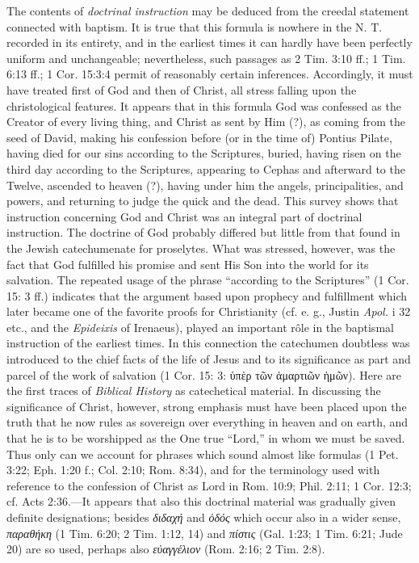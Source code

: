 The contents of \emph{doctrinal instruction} may be deduced from the creedal statement connected with baptism. It is true that this formula is nowhere in the N. T. recorded in its entirety, and in the earliest times it can hardly have been perfectly uniform and unchangeable; nevertheless, such passages as 2 Tim. 3:10 ff.; 1 Tim. 6:13 ff.; 1 Cor. 15:3:4 permit of reasonably certain inferences. Accordingly, it must have treated first of God and then of Christ, all stress falling upon the christological features. It appears that in this formula God was confessed as the Creator of every living thing, and Christ as sent by Him (?), as coming from the seed of David, making his confession before (or in the time of) Pontius Pilate, having died for our sins according to the Scriptures, buried, having risen on the third day according to the Scriptures, appearing to Cephas and afterward to the Twelve, ascended to heaven (?), having under him the angels, principalities, and powers, and returning to judge the quick and the dead. This survey shows that instruction concerning God and Christ was an integral part of doctrinal instruction. The doctrine of God probably differed but little from that found in the Jewish catechumenate for proselytes. What was stressed, however, was the fact that God fulfilled his promise and sent His Son into the world for its salvation. The repeated usage of the phrase “according to the Scriptures” (1 Cor. 15: 3 ff.) indicates that the argument based upon prophecy and fulfillment which later became one of the favorite proofs for Christianity (cf. e. g., Justin \emph{Apol.} i 32 etc., and the \emph{Epideixis} of Irenaeus), played an important rôle in the baptismal instruction of the earliest times. In this connection the catechumen doubtless was introduced to the chief facts of the life of Jesus and to its significance as part and parcel of the work of salvation (1 Cor. 15: 3: ὑπὲρ τῶν ἁμαρτιῶν ἡμῶν).
Here are the first traces of \emph{Biblical History} as catechetical material. In discussing the significance of Christ, however, strong emphasis must have been placed upon the truth that he now rules as sovereign over everything in heaven and on earth, and that he is to be worshipped as the One true “Lord,” in whom we must be saved. Thus only can we account for phrases which sound almost like formulas (1 Pet. 3:22; Eph. 1:20 f.; Col. 2:10; Rom. 8:34), and for the terminology used with reference to the confession of Christ as Lord in Rom. 10:9; Phil. 2:11; 1 Cor. 12:3; cf. Acts 2:36.—It appears that also this doctrinal material was gradually given definite designations; besides \emph{διδαχή} and \emph{ὁδός} which occur also in a wider sense, \emph{παραθήκη} (1 Tim. 6:20; 2 Tim. 1:12, 14) and \emph{πίστις} (Gal. 1:23; 1 Tim. 6:21; Jude 20) are so used, perhaps also \emph{εὐαγγέλιον} (Rom. 2:16; 2 Tim. 2:8).

